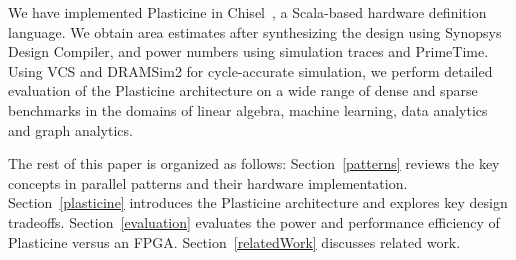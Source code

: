 

We have implemented Plasticine in Chisel~\cite{chisel}, a Scala-based hardware definition
language.  We obtain area estimates after synthesizing the design using Synopsys Design Compiler,
and power numbers using simulation traces and PrimeTime.
Using VCS and DRAMSim2 for cycle-accurate simulation, we perform detailed evaluation of
the Plasticine architecture on a wide range of dense and sparse benchmarks in the domains of linear algebra, machine
learning, data analytics and graph analytics.

The rest of this paper is organized as follows: Section~\ref{patterns}
reviews the key concepts in parallel patterns and their hardware
implementation. Section~\ref{plasticine} introduces the Plasticine architecture and
explores key design tradeoffs. Section~\ref{evaluation} evaluates
the power and performance efficiency of Plasticine versus an FPGA.
Section~\ref{relatedWork} discusses related work. 



